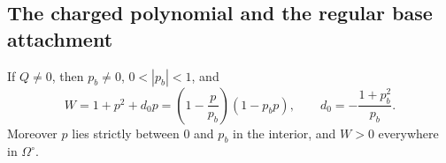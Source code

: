 \subsection{The charged polynomial and the regular base attachment}

\begin{lemma}
\label{stat:charged-polynomial}
If $Q\ne0$, then $p_b\ne0$, $0<|p_b|<1$, and
\begin{equation}
 W=1+p^2+d_0p
   =\left(1-\frac p{p_b}\right)(1-p_bp),
 \qquad d_0=-\frac{1+p_b^2}{p_b}.
 \label{stat:W-polynomial}
\end{equation}
Moreover $p$ lies strictly between $0$ and $p_b$ in the interior,
and $W>0$ everywhere in $\Omega^\circ$.
\end{lemma}

